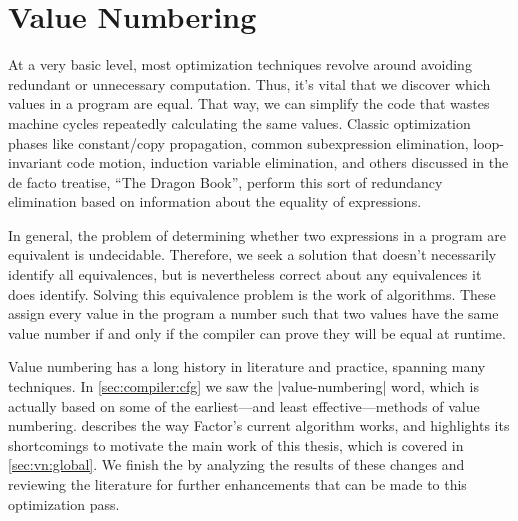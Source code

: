 \section{Value Numbering}\label{sec:vn}

At a very basic level, most optimization techniques revolve around avoiding
redundant or unnecessary computation.  Thus, it's vital that we discover which
values in a program are equal.  That way, we can simplify the code that wastes
machine cycles repeatedly calculating the same values.  Classic optimization
phases like constant/copy propagation, common subexpression elimination,
loop-invariant code motion, induction variable elimination, and others
discussed in the de facto treatise, ``The Dragon Book'', perform
this sort of redundancy elimination based on information about the equality of
expressions.

In general, the problem of determining whether two expressions in a program are
equivalent is undecidable.  Therefore, we seek a  solution
that doesn't necessarily identify all equivalences, but is nevertheless correct
about any equivalences it does identify.  Solving this equivalence problem is
the work of  algorithms.  These assign every value in the
program a number such that two values have the same value number if and only if
the compiler can prove they will be equal at runtime.

Value numbering has a long history in literature and practice, spanning many
techniques.  In \cref{sec:compiler:cfg} we saw the \factor|value-numbering|
word, which is actually based on some of the earliest---and least
effective---methods of value numbering.   describes the way
Factor's current algorithm works, and highlights its shortcomings to motivate
the main work of this thesis, which is covered in \cref{sec:vn:global}.  We
finish the  by analyzing the results of these changes and
reviewing the literature for further enhancements that can be made to this
optimization pass.


%
%
%
